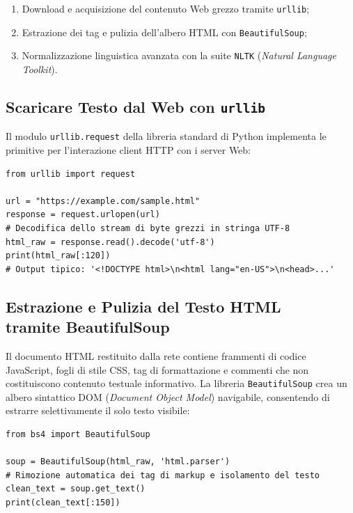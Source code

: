 \begin{enumerate}
    \item Download e acquisizione del contenuto Web grezzo tramite \texttt{urllib};
    \item Estrazione dei tag e pulizia dell'albero HTML con \texttt{BeautifulSoup};
    \item Normalizzazione linguistica avanzata con la suite \texttt{NLTK} (\textit{Natural Language Toolkit}).
\end{enumerate}

\FloatBarrier
\subsection{Scaricare Testo dal Web con \texttt{urllib}}
\label{subsec:scaricare-testo-urllib}

Il modulo \texttt{urllib.request} della libreria standard di Python implementa le primitive per l'interazione client HTTP con i server Web:

\begin{lstlisting}[style=pythoncode,caption={Scaricamento di una pagina Web con \texttt{urllib.request}.}]
from urllib import request

url = "https://example.com/sample.html"
response = request.urlopen(url)
# Decodifica dello stream di byte grezzi in stringa UTF-8
html_raw = response.read().decode('utf-8')
print(html_raw[:120])
# Output tipico: '<!DOCTYPE html>\n<html lang="en-US">\n<head>...'
\end{lstlisting}

\FloatBarrier
\subsection[Pulizia HTML con BeautifulSoup]{Estrazione e Pulizia del Testo HTML\\
tramite BeautifulSoup}
\label{subsec:pulizia-html-beautifulsoup}

Il documento HTML restituito dalla rete contiene frammenti di codice JavaScript, fogli di stile CSS, tag di formattazione e commenti che non costituiscono contenuto testuale informativo.
La libreria \texttt{BeautifulSoup} crea un albero sintattico DOM (\textit{Document Object Model}) navigabile, consentendo di estrarre selettivamente il solo testo visibile:

\begin{lstlisting}[style=pythoncode,caption={Estrazione del testo pulito tramite \texttt{BeautifulSoup}.}]
from bs4 import BeautifulSoup

soup = BeautifulSoup(html_raw, 'html.parser')
# Rimozione automatica dei tag di markup e isolamento del testo
clean_text = soup.get_text()
print(clean_text[:150])
\end{lstlisting}

